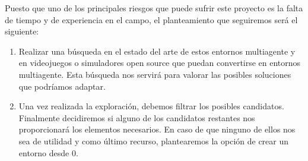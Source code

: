 Puesto que uno de los principales riesgos que puede sufrir este proyecto es la falta de tiempo y de experiencia en el campo, el planteamiento que seguiremos será el siguiente:
\begin{enumerate}
    \item Realizar una búsqueda en el estado del arte de estos entornos multiagente y en videojuegos o simuladores open source que puedan convertirse en entornos multiagente. Esta búsqueda nos servirá para valorar las posibles soluciones que podríamos adaptar.
    \item Una vez realizada la exploración, debemos filtrar los posibles candidatos. Finalmente decidiremos si alguno de los candidatos restantes nos proporcionará los elementos necesarios. En caso de que ninguno de ellos nos sea de utilidad y como último recurso, plantearemos la opción de crear un entorno desde 0.  
\end{enumerate}

